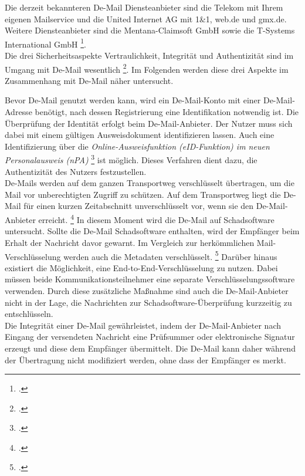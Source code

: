 \documentclass  [paper=a4,
				fontsize=12pt,
				listof=totoc,
				bibliography=totoc
				]{scrreprt}
\begin{document}
{			Die derzeit bekannteren De-Mail Diensteanbieter sind die Telekom mit Ihrem eigenen Mailservice und die United Internet AG mit 1\&1, web.de und gmx.de.
			Weitere Diensteanbieter sind die Mentana-Claimsoft GmbH sowie die T-Systems International GmbH \footcite[Vgl.][]{BSIDiensteanbieter}.\medskip\\
			
			Die drei Sicherheitsaspekte Vertraulichkeit, Integrität und Authentizität sind im Umgang mit De-Mail wesentlich \footcite[Vgl.][]{BSIGrundlagen}.
			Im Folgenden werden diese drei Aspekte im Zusammenhang mit De-Mail näher untersucht.
			
			Bevor De-Mail genutzt werden kann, wird ein De-Mail-Konto mit einer De-Mail-Adresse benötigt, nach dessen Registrierung eine Identifikation notwendig ist.
			Die Überprüfung der Identität erfolgt beim De-Mail-Anbieter.
			Der Nutzer muss sich dabei mit einem gültigen Ausweisdokument identifizieren lassen.
			Auch eine Identifizierung über die \textit{\glqq Online-Ausweisfunktion (eID-Funktion) im neuen Personalausweis (nPA)\grqq} \footcite[Vgl.][S. 13]{BSIDeMail} ist möglich.
			Dieses Verfahren dient dazu, die Authentizität des Nutzers festzustellen.\medskip\\
			
			De-Mails werden auf dem ganzen Transportweg verschlüsselt übertragen, um die Mail vor unberechtigten Zugriff zu schützen.
			Auf dem Transportweg liegt die De-Mail für einen kurzen Zeitabschnitt unverschlüsselt vor, wenn sie den De-Mail-Anbieter erreicht. \footcite[Vgl.][S. 16]{BSIDeMail} 
			In diesem Moment wird die De-Mail auf Schadsoftware untersucht. Sollte die De-Mail Schadsoftware enthalten, wird der Empfänger beim Erhalt der Nachricht davor gewarnt.
			Im Vergleich zur herkömmlichen Mail-Verschlüsselung werden auch die Metadaten verschlüsselt. \footcite[Vgl.][]{BSIMerkmale}
			Darüber hinaus existiert die Möglichkeit, eine End-to-End-Verschlüsselung zu nutzen.
			Dabei müssen beide Kommunikationsteilnehmer eine separate Verschlüsselungssoftware verwenden. Durch diese zusätzliche Maßnahme sind auch die De-Mail-Anbieter nicht in der Lage, die Nachrichten zur Schadsoftware-Überprüfung kurzzeitig zu entschlüsseln.\medskip\\
			
			Die Integrität einer De-Mail gewährleistet, indem der De-Mail-Anbieter nach Eingang der versendeten Nachricht eine Prüfsummer oder elektronische Signatur erzeugt und diese dem Empfänger übermittelt.
			Die De-Mail kann daher während der Übertragung nicht modifiziert werden, ohne dass der Empfänger es merkt.
			
}
\end{document}

